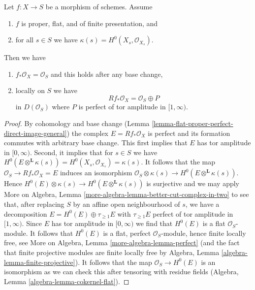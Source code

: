 \begin{lemma}
\label{lemma-proper-flat-h0}
Let $f : X \to S$ be a morphism of schemes. Assume
\begin{enumerate}
\item $f$ is proper, flat, and of finite presentation, and
\item for all $s \in S$ we have $\kappa(s) = H^0(X_s, \mathcal{O}_{X_s})$.
\end{enumerate}
Then we have
\begin{enumerate}
\item[(a)] $f_*\mathcal{O}_X = \mathcal{O}_S$ and
this holds after any base change,
\item[(b)] locally on $S$ we have
$$
Rf_*\mathcal{O}_X = \mathcal{O}_S \oplus P
$$
in $D(\mathcal{O}_S)$
where $P$ is perfect of tor amplitude in $[1, \infty)$.
\end{enumerate}
\end{lemma}

\begin{proof}
By cohomology and base change
(Lemma \ref{lemma-flat-proper-perfect-direct-image-general})
the complex $E = Rf_*\mathcal{O}_X$
is perfect and its formation commutes with arbitrary base change.
This first implies that $E$ has tor amplitude in $[0, \infty)$.
Second, it implies that for $s \in S$ we have
$H^0(E \otimes^\mathbf{L} \kappa(s)) =
H^0(X_s, \mathcal{O}_{X_s}) = \kappa(s)$.
It follows that the map $\mathcal{O}_S \to Rf_*\mathcal{O}_X = E$
induces an isomorphism
$\mathcal{O}_S \otimes \kappa(s) \to H^0(E \otimes^\mathbf{L} \kappa(s))$.
Hence $H^0(E) \otimes \kappa(s) \to H^0(E \otimes^\mathbf{L} \kappa(s))$
is surjective and we may apply
More on Algebra, Lemma \ref{more-algebra-lemma-better-cut-complex-in-two}
to see that, after replacing $S$ by an affine open neighbourhood of $s$,
we have a decomposition $E = H^0(E) \oplus \tau_{\geq 1}E$
with $\tau_{\geq 1}E$ perfect of tor amplitude in $[1, \infty)$.
Since $E$ has tor amplitude in $[0, \infty)$ we find that
$H^0(E)$ is a flat $\mathcal{O}_S$-module.
It follows that $H^0(E)$ is a flat, perfect $\mathcal{O}_S$-module,
hence finite locally free, see
More on Algebra, Lemma \ref{more-algebra-lemma-perfect}
(and the fact that finite projective modules are finite locally free by
Algebra, Lemma \ref{algebra-lemma-finite-projective}).
It follows that the map $\mathcal{O}_S \to H^0(E)$ is
an isomorphism as we can check this after tensoring with
residue fields (Algebra, Lemma \ref{algebra-lemma-cokernel-flat}).
\end{proof}

